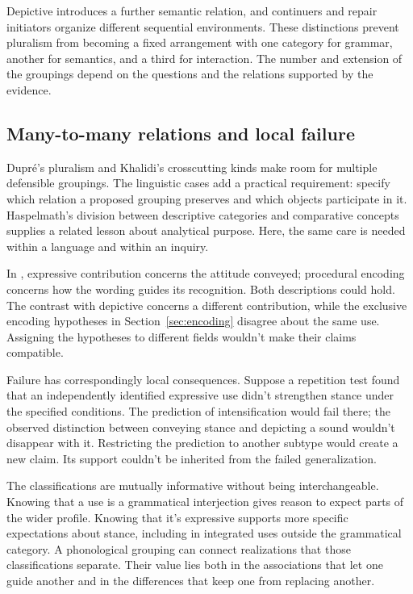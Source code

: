 \documentclass[12pt]{article}
\begin{document}
Depictive  introduces a further semantic relation, and continuers
and repair initiators organize different sequential environments. These
distinctions prevent pluralism from becoming a fixed arrangement with
one category for grammar, another for semantics, and a third for interaction.
The number and extension of the groupings depend on the questions
and the relations supported by the evidence.

\subsection{Many-to-many relations and local failure}

Dupr\'e's pluralism and Khalidi's crosscutting kinds make room for
multiple defensible groupings. The linguistic cases add a practical
requirement: specify which relation a proposed grouping preserves and
which objects participate in it. Haspelmath's division between descriptive
categories and comparative concepts supplies a related lesson about
analytical purpose. Here, the same care is needed within a language
and within an inquiry.

In , expressive contribution concerns
the attitude conveyed; procedural encoding concerns how the wording
guides its recognition. Both descriptions could hold. The contrast with
depictive  concerns a different contribution, while the
exclusive encoding hypotheses in Section~\ref{sec:encoding} disagree about
the same use. Assigning the hypotheses to different fields wouldn't
make their claims compatible.

Failure has correspondingly local consequences. Suppose a repetition
test found that an independently identified expressive use didn't
strengthen stance under the specified conditions. The prediction of
intensification would fail there; the observed distinction between
conveying stance and depicting a sound wouldn't disappear with it.
Restricting the prediction to another subtype would create a new
claim. Its support couldn't be inherited from the failed generalization.

The classifications are mutually informative without being interchangeable.
Knowing that a use is a grammatical interjection gives reason to
expect parts of the wider profile. Knowing that it's expressive
supports more specific expectations about stance, including in integrated
uses outside the grammatical category. A phonological grouping can
connect realizations that those classifications separate. Their value lies
both in the associations that let one guide another and in the
differences that keep one from replacing another.
\end{document}

